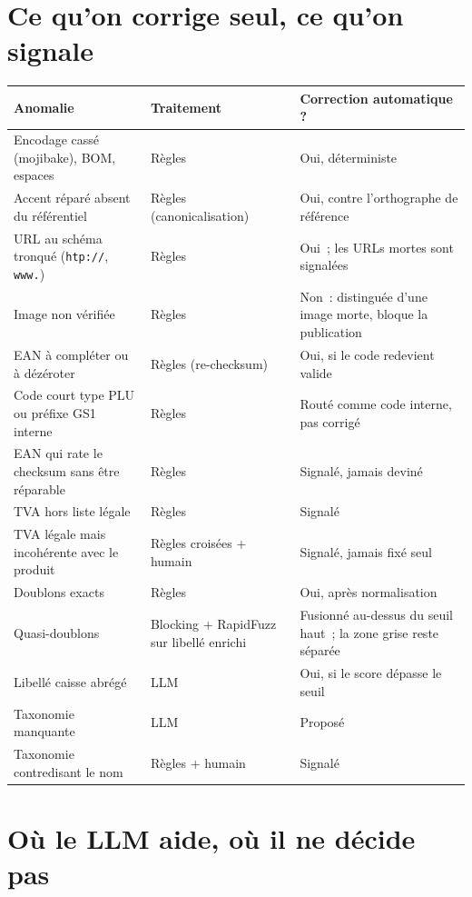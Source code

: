 \documentclass[11pt,a4paper]{article}
\begin{document}
\section*{Ce qu'on corrige seul, ce qu'on signale}

\renewcommand{\arraystretch}{1.25}
\begin{tabularx}{\linewidth}{L{5.6cm} L{4.0cm} X}
\toprule
\textbf{Anomalie} & \textbf{Traitement} & \textbf{Correction automatique ?} \\
\midrule
Encodage cassé (mojibake), BOM, espaces & Règles & Oui, déterministe \\
Accent réparé absent du référentiel & Règles (canonicalisation) & Oui, contre l'orthographe de référence \\
URL au schéma tronqué (\texttt{htp://}, \texttt{www.}) & Règles & Oui~; les URLs mortes sont signalées \\
Image non vérifiée & Règles & Non~: distinguée d'une image morte, bloque la publication \\
EAN à compléter ou à dézéroter & Règles (re-checksum) & Oui, si le code redevient valide \\
Code court type PLU ou préfixe GS1 interne & Règles & Routé comme code interne, pas \guillemotleft{} corrigé \guillemotright{} \\
EAN qui rate le checksum sans être réparable & Règles & Signalé, jamais deviné \\
TVA hors liste légale & Règles & Signalé \\
TVA légale mais incohérente avec le produit & Règles croisées + humain & Signalé, jamais fixé seul \\
Doublons exacts & Règles & Oui, après normalisation \\
Quasi-doublons & Blocking + RapidFuzz sur libellé enrichi & Fusionné au-dessus du seuil haut~; la zone grise reste séparée \\
Libellé caisse abrégé & LLM & Oui, si le score dépasse le seuil \\
Taxonomie manquante & LLM & Proposé \\
Taxonomie contredisant le nom & Règles + humain & Signalé \\
\bottomrule
\end{tabularx}

\section*{Où le LLM aide, où il ne décide pas}
\end{document}
